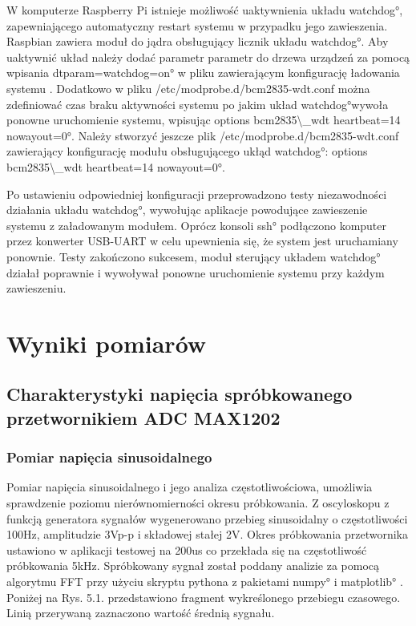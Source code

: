 W komputerze Raspberry Pi istnieje możliwość uaktywnienia układu \ang{watchdog}, zapewniającego automatyczny restart systemu w przypadku jego zawieszenia. 
Raspbian zawiera moduł do jądra obsługujący licznik układu \ang{watchdog}. 
Aby uaktywnić układ należy dodać parametr parametr do drzewa urządzeń za pomocą wpisania \ang{dtparam=watchdog=on} w pliku zawierającym konfigurację ładowania systemu \cite{watchdog}. Dodatkowo w pliku /etc/modprobe.d/bcm2835-wdt.conf można zdefiniować czas braku aktywności systemu po jakim układ \ang{watchdog}wywoła ponowne uruchomienie systemu, wpisując \ang{options bcm2835\_wdt heartbeat=14 nowayout=0}. Należy stworzyć jeszcze plik /etc/modprobe.d/bcm2835-wdt.conf zawierający konfigurację modułu obsługującego ukłąd \ang{watchdog}: \ang{options bcm2835\_wdt heartbeat=14 nowayout=0}.

Po ustawieniu odpowiedniej konfiguracji przeprowadzono testy niezawodności działania układu \ang{watchdog}, wywołując aplikacje powodujące zawieszenie systemu z załadowanym modułem. Oprócz konsoli \ang{ssh} podłączono komputer przez konwerter USB-UART w celu upewnienia się, że system jest uruchamiany ponownie.
Testy zakończono sukcesem, moduł sterujący układem \ang{watchdog} działał poprawnie i wywoływał ponowne uruchomienie systemu przy każdym zawieszeniu. 


\section{Wyniki pomiarów}


\subsection{Charakterystyki napięcia spróbkowanego przetwornikiem ADC MAX1202}

\subsubsection{Pomiar napięcia sinusoidalnego}

Pomiar napięcia sinusoidalnego i jego analiza częstotliwościowa, umożliwia sprawdzenie poziomu nierównomierności okresu próbkowania. 
Z oscyloskopu z funkcją generatora sygnałów wygenerowano przebieg sinusoidalny o częstotliwości 100Hz, amplitudzie 3Vp-p i składowej stałej 2V. Okres próbkowania przetwornika ustawiono w aplikacji testowej na 200us co przekłada się na częstotliwość próbkowania 5kHz. 
Spróbkowany sygnał został poddany analizie za pomocą algorytmu FFT przy użyciu skryptu pythona z pakietami \ang{numpy} i  \ang{matplotlib} .
Poniżej na Rys. 5.1. przedstawiono fragment wykreślonego przebiegu czasowego. Linią przerywaną zaznaczono wartość średnią sygnału.

